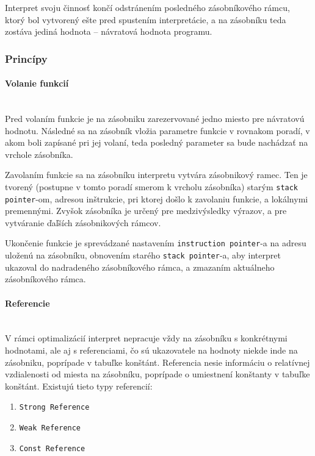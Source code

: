 \documentclass[12pt,a4paper,titlepage,final]{article}
\begin{document}
Interpret svoju činnosť končí odstránením posledného zásobníkového rámcu, ktorý bol vytvorený ešte pred spustením
interpretácie, a na zásobníku teda zostáva jediná hodnota -- návratová hodnota programu. 

\subsubsection{Princípy}

\paragraph{Volanie funkcií}\mbox{}\\

Pred volaním funkcie je na zásobniku zarezervované jedno miesto pre návratovú hodnotu.
Následné sa na zásobník vložia parametre funkcie v rovnakom poradí, v akom boli zapísané pri
jej volaní, teda posledný parameter sa bude nachádzať na vrchole zásobníka. 

Zavolaním funkcie sa na zásobníku interpretu vytvára zásobnikový ramec. Ten je tvorený (postupne v tomto
poradí smerom k vrcholu zásobníka) starým \texttt{stack pointer}-om, adresou inštrukcie, pri ktorej došlo k
zavolaniu funkcie, a lokálnymi premennými. Zvyšok zásobníka je určený pre medzivýsledky výrazov, a pre
vytváranie ďaľších zásobnikových rámcov.

Ukončenie funkcie je sprevádzané nastavením \texttt{instruction pointer}-a na adresu uloženú na zásobníku,
obnovením starého \texttt{stack pointer}-a, aby interpret ukazoval do nadradeného zásobníkového rámca,
a zmazaním aktuálneho zásobníkového rámca.

\paragraph{Referencie}\mbox{}\\

V rámci optimalizácií interpret nepracuje vždy na zásobníku s konkrétnymi hodnotami,
ale aj s referenciami, čo sú ukazovatele na hodnoty niekde inde na zásobniku, poprípade
v tabuľke konštánt. Referencia nesie informáciu o relatívnej vzdialenosti od miesta
na zásobníku, poprípade o umiestnení konštanty v tabuľke konštánt. Existujú tieto typy referencií:

\begin{enumerate}
    \itemsep0em
    \item \texttt{Strong Reference}
    \item \texttt{Weak Reference}
    \item \texttt{Const Reference}
\end{enumerate}
\end{document}

